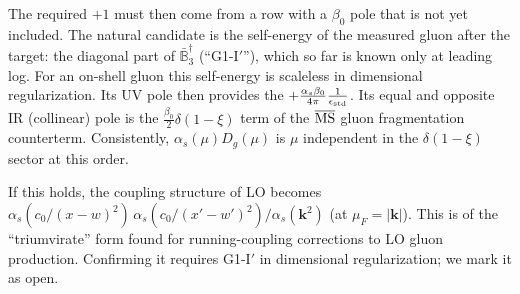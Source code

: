 \documentclass[10pt]{article}
\numberwithin{equation}{section}
\newcommand{\ve}{\epsilon}
\def\mf#1{\mathbb{#1}}
\begin{document}
The required $+1$ must then come from a row with a $\beta_0$ pole that is not yet included. The natural candidate is the self-energy of the measured gluon after the target: the diagonal part of $\bar{\mf B}_3^\dagger$ (``G1-I$'$''), which so far is known only at leading log. For an on-shell gluon this self-energy is scaleless in dimensional regularization. Its UV pole then provides the $+\frac{\alpha_s\beta_0}{4\pi}\frac1{\ve_{\rm std}}$. Its equal and opposite IR (collinear) pole is the $\frac{\beta_0}{2}\delta(1-\xi)$ term of the $\overline{\rm MS}$ gluon fragmentation counterterm. Consistently, $\alpha_s(\mu)D_g(\mu)$ is $\mu$ independent in the $\delta(1-\xi)$ sector at this order.

If this holds, the coupling structure of LO becomes $\alpha_s(c_0/(x-w)^2)\,\alpha_s(c_0/(x'-w')^2)/\alpha_s(\mathbf k^2)$ (at $\mu_F=|\mathbf k|$). This is of the ``triumvirate'' form found for running-coupling corrections to LO gluon production. Confirming it requires G1-I$'$ in dimensional regularization; we mark it as open.

\end{document}
